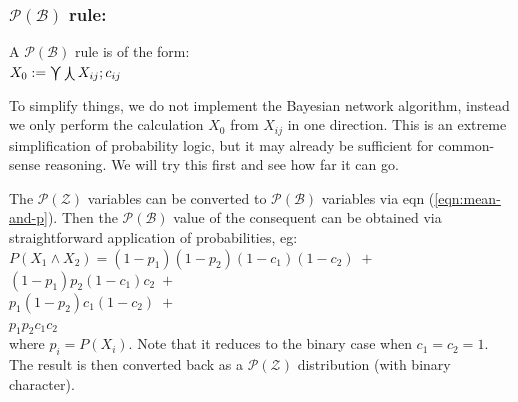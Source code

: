 \documentclass[a4paper]{report}
\begin{document}

\subsubsection{$\mathcal{P(B)}$ rule:}

A $\mathcal{P(B)}$ rule is of the form:\\
\hspace*{1cm} $X_0 := \bigcurlyvee \bigcurlywedge X_{ij};c_{ij}$

To simplify things, we do not implement the Bayesian network algorithm, instead we only perform the calculation $X_0$ from $X_{ij}$ in one direction.  This is an extreme simplification of probability logic, but it may already be sufficient for common-sense reasoning.  We will try this first and see how far it can go.

The $\mathcal{P}(\mathcal{Z})$ variables can be converted to $\mathcal{P}(\mathcal{B})$ variables via eqn (\ref{eqn:mean-and-p}).  Then the $\mathcal{P(B)}$ value of the consequent can be obtained via straightforward application of probabilities, eg:\\
\hspace*{1cm} $ P(X_1 \wedge X_2) = (1-p_1)(1-p_2)(1-c_1)(1-c_2) \; + $ \\
\hspace*{3.5cm} $ (1-p_1)p_2(1-c_1)c_2 \; + $ \\
\hspace*{3.5cm} $ p_1(1-p_2)c_1(1-c_2) \; + $ \\
\hspace*{3.5cm} $ p_1 p_2 c_1 c_2 $ \\
where $p_i = P(X_i)$.  Note that it reduces to the binary case when $c_1 = c_2 = 1$.  The result is then converted back as a $\mathcal{P(Z)}$ distribution (with binary character).
\end{document}
